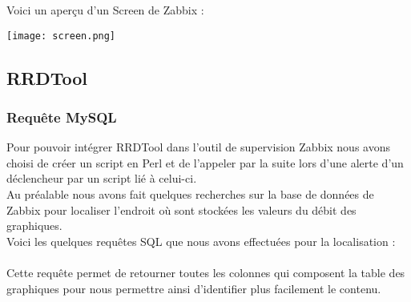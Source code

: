 Voici un aperçu d'un Screen de Zabbix :

\begin{center}

		\texttt{[image: screen.png]}

		\vspace{0.3cm}

\end{center}

	
\vspace{0.3cm}


	\subsection{RRDTool}
		\vspace{0.3cm}


		\subsubsection{Requête MySQL}
			\vspace{0.3cm}

		Pour pouvoir intégrer RRDTool dans l'outil de supervision Zabbix nous avons choisi de créer un script en Perl et de l'appeler par la suite lors d'une alerte d'un déclencheur par un script lié à celui-ci.\\

		Au préalable nous avons fait quelques recherches sur la base de données de Zabbix pour localiser l'endroit où sont stockées les valeurs du débit des graphiques.\\

		Voici les quelques requêtes SQL que nous avons effectuées pour la localisation : \\

\\

Cette requête permet de retourner toutes les colonnes qui composent la table des graphiques pour nous permettre ainsi d'identifier plus facilement le contenu.\\

\\

